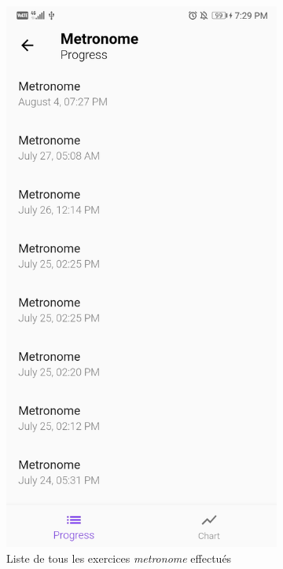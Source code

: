 \begin{appendices}
\begin{landscape}
\begin{figure}[h]
\begin{subfigure}{.25\textwidth}
    \includegraphics[width=.75\linewidth]{content/imgs/screen7.jpg}
    \caption{Liste de tous les exercices \textit{metronome} effectués}
    \label{appendix:screen_progress2}
  \end{subfigure}%
  \begin{subfigure}{.25\textwidth}
    \centering

\end{subfigure}
\end{figure}
\end{landscape}
\end{appendices}
